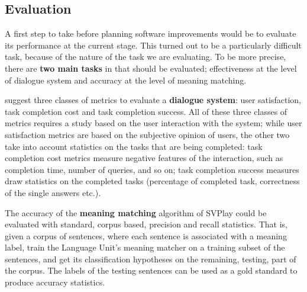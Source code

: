 \subsection{Evaluation} \label{ch:conclusions:fw:eval}
A first step to take before planning software improvements would be to evaluate its performance at the current stage. This turned out to be a particularly difficult task, because of the nature of the task we are evaluating. To be more precise, there are \textbf{two main tasks} in \pname that should be evaluated; effectiveness at the level of dialogue system and accuracy at the level of meaning matching.

\cite{Jurafsky} suggest three classes of metrics to evaluate a \textbf{dialogue system}: user satisfaction, task completion cost and task completion success. All of these three classes of metrics requires a study based on the user interaction with the system; while user satisfaction metrics are based on the subjective opinion of users, the other two take into account statistics on the tasks that are being completed: task completion cost metrics measure negative features of the interaction, such as completion time, number of queries, and so on; task completion success measures draw statistics on the completed tasks (percentage of completed task, correctness of the single answers etc.).
 
The accuracy of the \textbf{meaning matching} algorithm of SVPlay could be evaluated with standard, corpus based, precision and recall statistics. That is, given a corpus of sentences, where each sentence is associated with a meaning label, train the Language Unit's meaning matcher on a training subset of the sentences, and get its classification hypotheses on the remaining, testing, part of the corpus. The labels of the testing sentences can be used as a gold standard to produce accuracy statistics.


